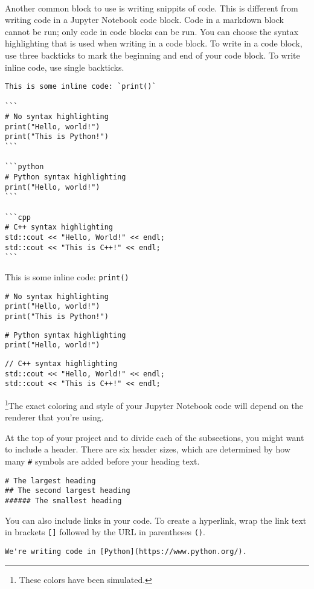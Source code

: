 \\
Another common block to use is writing snippits of code. This is different from writing code in a Jupyter Notebook code block. Code in a markdown block cannot be run; only code in code blocks can be run. You can choose the syntax highlighting that is used when writing in a code block. To write in a code block, use three backticks to mark the beginning and end of your code block. To write inline code, use single backticks.\par
{}
\begin{lstlisting}
This is some inline code: `print()`

```
# No syntax highlighting
print("Hello, world!")
print("This is Python!")
```

```python
# Python syntax highlighting
print("Hello, world!")
```

```cpp
# C++ syntax highlighting
std::cout << "Hello, World!" << endl;
std::cout << "This is C++!" << endl;
```
\end{lstlisting}
This is some inline code: \verb|print()|
\\
\begin{lstlisting}
# No syntax highlighting
print("Hello, world!")
print("This is Python!")
\end{lstlisting}
\begin{lstlisting}[style=pippython]
# Python syntax highlighting
print("Hello, world!")
\end{lstlisting}

\begin{lstlisting}[style=cpp]
// C++ syntax highlighting
std::cout << "Hello, World!" << endl;
std::cout << "This is C++!" << endl;
\end{lstlisting}
\footnote{These colors have been simulated.}The exact coloring and style of your Jupyter Notebook code will depend on the renderer that you're using.\par
At the top of your project and to divide each of the subsections, you might want to include a header. There are six header sizes, which are determined by how many \verb|#| symbols are added before your heading text.
\begin{lstlisting}
# The largest heading
## The second largest heading
###### The smallest heading
\end{lstlisting}
You can also include links in your code. To create a hyperlink, wrap the link text in brackets \verb|[]| followed by the URL in parentheses \verb|()|.\par
\begin{lstlisting}
We're writing code in [Python](https://www.python.org/).
\end{lstlisting}

